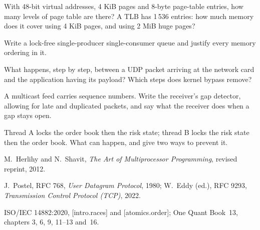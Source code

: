 \begin{interviewq}\label{iq:iv:concurrency-operating-systems-and-networks:9}
With 48-bit virtual addresses, 4 KiB pages and 8-byte page-table entries, how many levels of page table are there? A TLB has 1\,536
entries: how much memory does it cover using 4 KiB pages, and using 2 MiB huge pages?
\end{interviewq}

\begin{interviewq}\label{iq:iv:concurrency-operating-systems-and-networks:10}
Write a lock-free single-producer single-consumer queue and justify every memory ordering in it.
\end{interviewq}

\begin{interviewq}\label{iq:iv:concurrency-operating-systems-and-networks:11}
What happens, step by step, between a UDP packet arriving at the network card and the application having its payload? Which steps
does kernel bypass remove?
\end{interviewq}

\begin{interviewq}\label{iq:iv:concurrency-operating-systems-and-networks:12}
A multicast feed carries sequence numbers. Write the receiver's gap detector, allowing for late and duplicated packets, and say
what the receiver does when a gap stays open.
\end{interviewq}

\begin{interviewq}\label{iq:iv:concurrency-operating-systems-and-networks:13}
Thread A locks the order book then the risk state; thread B locks the risk state then the order book. What can happen, and give
two ways to prevent it.
\end{interviewq}

\begin{omsources}
\item M.~Herlihy and N.~Shavit, \emph{The Art of Multiprocessor Programming}, revised reprint, 2012.
\item J.~Postel, RFC 768, \emph{User Datagram Protocol}, 1980; W.~Eddy (ed.), RFC 9293, \emph{Transmission Control Protocol (TCP)},
2022.
\item ISO/IEC 14882:2020, [intro.races] and [atomics.order]; One Quant Book~13, chapters 3, 6, 9, 11--13 and~16.
\end{omsources}
